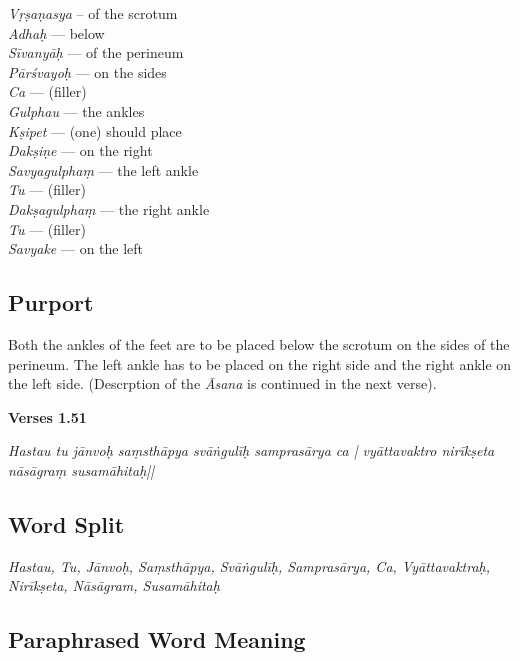 \begin{multicols}{2}
\textit{Vṛṣaṇasya} -- of the scrotum  \\ 
\textit{Adhaḥ} ---  below  \\
\textit{Sīvanyāḥ} ---  of the perineum  \\
\textit{Pārśvayoḥ} ---  on the sides  \\
\textit{Ca} ---  (filler) \\
\textit{Gulphau} ---  the ankles  \\
\textit{Kṣipet} ---   (one) should place  \\
\textit{Dakṣiṇe} --- on the right  \\
\textit{Savyagulphaṃ} --- the left ankle  \\
\textit{Tu} ---  (filler) \\
\textit{Dakṣagulphaṃ} ---  the right ankle  \\
\textit{Tu} ---  (filler) \\
\textit{Savyake} --- on the left 
\end{multicols}

\subsection*{Purport}
\vspace{-5pt}

Both the ankles of the feet are to be placed below the scrotum on the sides of the perineum. The left ankle has to be placed on the right side and the right ankle on the left side. (Descrption of the \textit{Āsana} is continued in the next verse).

\noindent \textbf{Verses 1.51}

\begin{center}
\textit{Hastau tu jānvoḥ saṃsthāpya svāṅgulīḥ samprasārya ca |
vyāttavaktro nirīkṣeta nāsāgraṃ susamāhitaḥ||}
\end{center}

\subsection*{Word Split}

\textit{Hastau, Tu, Jānvoḥ, Saṃsthāpya, Svāṅgulīḥ, Samprasārya, Ca, Vyāttavaktraḥ, Nirīkṣeta, Nāsāgram, Susamāhitaḥ}

\subsection*{Paraphrased Word Meaning}

